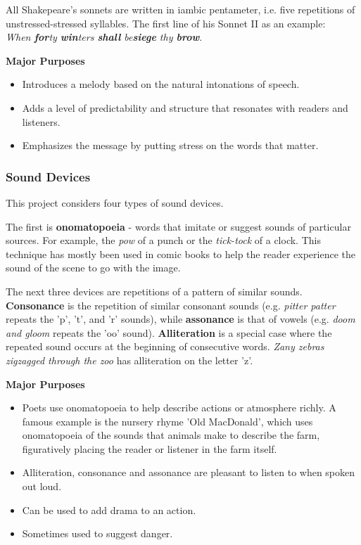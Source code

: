 All Shakepeare's sonnets are written in iambic pentameter, i.e. five repetitions of unstressed-stressed syllables. The first line of his Sonnet II as an example:\\
\textit{When \textbf{for}ty \textbf{win}ters \textbf{shall} be\textbf{siege} thy \textbf{brow}}.

\textbf{Major Purposes}
\begin{itemize}
\item{Introduces a melody based on the natural intonations of speech.} 
\item{Adds a level of predictability and structure that resonates with readers and listeners.}
\item{Emphasizes the message by putting stress on the words that matter.}
\end{itemize}


\subsubsection{Sound Devices}
\label{sec:sound}
This project considers four types of sound devices.

The first is \textbf{onomatopoeia} - words that imitate or suggest sounds of particular sources. For example, the \textit{pow} of a punch or the \textit{tick-tock} of a clock. This technique has mostly been used in comic books to help the reader experience the sound of the scene to go with the image.

The next three devices are repetitions of a pattern of similar sounds. \textbf{Consonance} is the repetition of similar consonant sounds (e.g. \textit{pitter patter} repeats the 'p', 't', and 'r' sounds), while \textbf{assonance} is that of vowels (e.g. \textit{doom and gloom} repeats the 'oo' sound). \textbf{Alliteration} is a special case where the repeated sound occurs at the beginning of consecutive words. \textit{Zany zebras zigzagged through the zoo} has alliteration on the letter 'z'.

\textbf{Major Purposes}
\begin{itemize}
\item{Poets use onomatopoeia to help describe actions or atmosphere richly. A famous example is the nursery rhyme 'Old MacDonald', which uses onomatopoeia of the sounds that animals make to describe the farm, figuratively placing the reader or listener in the farm itself.} 
\item{Alliteration, consonance and assonance are pleasant to listen to when spoken out loud.}
\item{Can be used to add drama to an action.}
\item{Sometimes used to suggest danger.}
\end{itemize}


